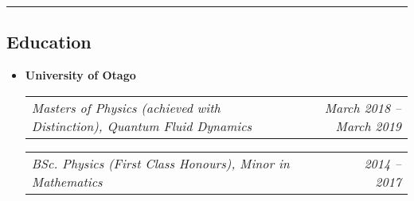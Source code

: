 \documentclass[10pt,letterpaper]{article}
\makeatletter
\newcommand{\headerrow}[2]
{\begin{tabular*}{\linewidth}{l@{\extracolsep{\fill}}r}
  #1 &
  #2 \\
\end{tabular*}}
\makeatother
\begin{document}
\begin{itemize}
%

\end{itemize}


\hrule

\subsection*{Education}

\begin{itemize}
	\parskip=0.1em
	
	\item 
	{\textbf{University of Otago}}
	
	
	\headerrow
	{\emph{Masters of Physics (achieved with Distinction), Quantum Fluid Dynamics}}
	{\emph{March 2018 -- March 2019}}
	
	\headerrow
	{\emph{BSc. Physics (First Class Honours), Minor in Mathematics}}
	{\emph{2014 -- 2017}}
	
	
		
\end{itemize}
\end{document}
